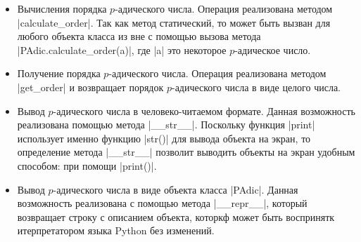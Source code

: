 \documentclass[master, och, diploma, times]{sty/SCWorks}
\theoremstyle{plain}
\theoremstyle{definition}
\begin{document}
\begin{itemize}
\item Вычисления порядка $p$-адического числа. Операция реализована методом |calculate_order|. Так как метод статический, то может быть вызван для любого объекта класса из вне с помощью вызова метода \\ |PAdic.calculate_order(a)|, где |a| это некоторое $p$-адическое число.
\item Получение порядка $p$-адического числа. Операция реализована методом |get_order| и возвращает порядок $p$-адического числа в виде целого числа.
\item Вывод $p$-адического числа в человеко-читаемом формате. Данная возможность реализована  помощью метода |__str__|. Поскольку функция |print| использует именно функцию |str()| для вывода объекта на экран, то определение метода |__str__| позволит выводить объекты на экран удобным способом: при помощи |print()|.
\item Вывод $p$-адического числа в виде объекта класса |PAdic|. Данная возможность реализована с помощью метода |__repr__|, который возвращает строку с описанием объекта, которкф может быть воспринятк итерпретатором языка Python без изменений.
\end{itemize}
\end{document}
